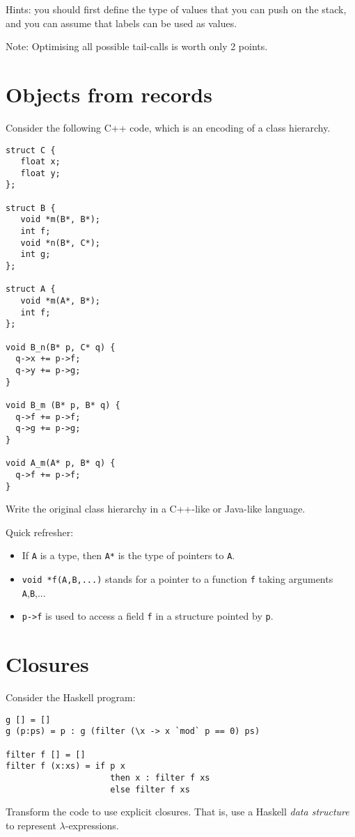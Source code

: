 \documentclass{article}
\begin{document}
Hints: you should first define the type of values that you can push on
the stack, and you can assume that labels can be used as values.

Note: Optimising all possible tail-calls is worth only 2 points.

\newpage
\section{Objects from records}

Consider the following C++ code, which is an encoding of a class
hierarchy.
\begin{verbatim}
struct C {
   float x;
   float y;
};

struct B {
   void *m(B*, B*);
   int f;
   void *n(B*, C*);
   int g;
};

struct A {
   void *m(A*, B*);
   int f;
};

void B_n(B* p, C* q) {
  q->x += p->f;
  q->y += p->g;
}

void B_m (B* p, B* q) {
  q->f += p->f;
  q->g += p->g;
}

void A_m(A* p, B* q) {
  q->f += p->f;
}
\end{verbatim}

Write the original class hierarchy in a C++-like or Java-like language.

Quick refresher:
\begin{itemize}
\item If \texttt{A} is a type, then \texttt{A*} is the type of
  pointers to \texttt{A}.
\item \texttt{void *f(A,B,...)} stands for a pointer to a function
  \texttt{f} taking arguments \texttt{A},\texttt{B},...
\item \texttt{p->f} is used to access a field \texttt{f} in a
  structure pointed by \texttt{p}.
\end{itemize}
\newpage
\section{Closures}
Consider the Haskell program:

\begin{verbatim}
g [] = []
g (p:ps) = p : g (filter (\x -> x `mod` p == 0) ps)

filter f [] = []
filter f (x:xs) = if p x 
                     then x : filter f xs  
                     else filter f xs
\end{verbatim}

Transform the code to use explicit closures. That is, use a Haskell
\emph{data structure} to represent $\lambda$-expressions.
\end{document}
